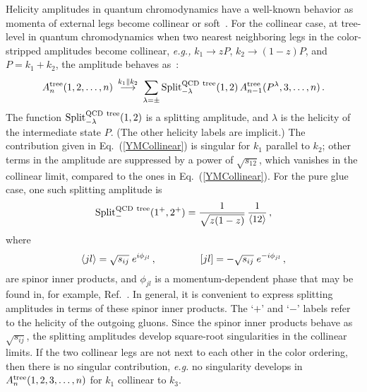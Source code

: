\documentclass[12pt]{livrev}
\begin{document}
Helicity amplitudes in quantum chromodynamics have a well-known
behavior as momenta of external legs become collinear or
soft~\cite{ManganoReview,Review}.  For the collinear case, at
tree-level in quantum chromodynamics when two nearest neighboring
legs in the color-stripped amplitudes become collinear, {\it e.g.,} $k_1
\rightarrow z P$, $k_2 \rightarrow (1-z) P$, and $P = k_1 + k_2$, 
the amplitude behaves as~\cite{ManganoReview}:
%
\begin{equation}
A_n^{\rm tree}(1,2,\ldots,n)\ \mathop{\longrightarrow}^{k_1 \parallel k_2}\ 
 \sum_{\lambda = \pm} 
{\mathop{\rm Split}\nolimits}_{-\lambda}^{\rm QCD\ tree}(1,2) \, 
    A_{n-1}^{\rm tree}(P^\lambda,3,\ldots,n)\,.
\label{YMCollinear}
\end{equation}
%
The function ${\mathop{\rm Split}\nolimits}_{-\lambda}^{\rm QCD\
tree}(1,2)$ is a splitting amplitude, and $\lambda$ is the helicity of
the intermediate state $P$.  (The other helicity labels are implicit.)
The contribution given in Eq.~(\ref{YMCollinear}) is singular for
$k_1$ parallel to $k_2$; other terms in the amplitude are suppressed
by a power of $\sqrt{s_{12}}$, which vanishes in the collinear limit, 
compared to the ones in
Eq.~(\ref{YMCollinear}).  For the pure glue case, one such splitting
amplitude is
%
\begin{equation}
{\mathop{\rm Split}\nolimits}_-^{\rm QCD\ tree}(1^+,2^+) 
= {1\over \sqrt{z (1-z)}} \, {1\over \langle {1}{2} \rangle} \,,
\label{YMSplitExample}
\end{equation}
%
where 
%
\begin{equation}
\langle j l \rangle =  
\sqrt{s_{ij}}\; e^{i \phi_{jl}}\,, \, \hskip 1.5 cm 
[j l]  = -\sqrt{s_{ij}}\; e^{-i \phi_{jl}}\,,
\label{SpinorsDefs}
\end{equation}
%
are spinor inner products, and $\phi_{jl}$ is a momentum-dependent
phase that may be found in, for example, Ref.~\cite{ManganoReview}.
In general, it is convenient to express splitting amplitudes in terms
of these spinor inner products. The `$+$' and `$-$' labels refer to
the helicity of the outgoing gluons.  Since the spinor inner products
behave as $\sqrt{s_{ij}}$, the splitting amplitudes develop
square-root singularities in the collinear limits.  If the two
collinear legs are not next to each other in the color ordering, then
there is no singular contribution, {\it e.g.} no singularity develops
in $A_n^{\rm tree}(1,2,3,\ldots,n)$ for $k_1$ collinear to $k_3$.
\end{document}
